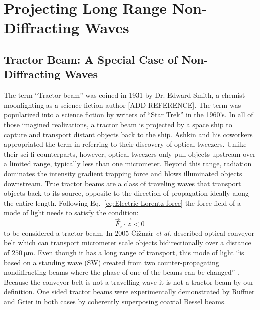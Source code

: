 \chapter{Projecting Long Range Non-Diffracting Waves}
\label{ch:intermediate}

\section{Tractor Beam: A Special Case of  Non-Diffracting Waves}

The term ``Tractor beam'' was coined in 1931 by Dr. Edward Smith, a chemist moonlighting as a science fiction author [ADD REFERENCE]. The term was popularized into a science fiction by writers of ``Star Trek'' in the 1960's. In all of those imagined realizations, a tractor beam is projected by a space ship to capture and transport distant objects back to the ship. 
Ashkin and his coworkers \cite{block1992} appropriated the term in referring to their discovery of optical tweezers. Unlike their sci-fi counterparts, however, optical tweezers only pull objects upstream over a limited range, typically less than one micrometer. Beyond this range, radiation dominates the intensity gradient trapping force and blows illuminated objects downstream. True tractor beams are a class of traveling waves that transport objects back to its source, opposite to the direction of propagation ideally along the entire length. Following Eq.~\eqref{eq:Electric Lorentz force} the force field of a mode of light needs to satisfy the condition:
\begin{equation}
\label{eq:Tractor Fz condition}
\vec{F}_{z}\cdot \vec{\hat{z}} <0
\end{equation}
to be considered a tractor beam. In $2005 $ \v Ci\v zm\'ar \emph{et al.} \cite{cizmar2005} described optical conveyor belt which can transport micrometer scale objects bidirectionally over a distance of $\SI{250}{\um}$. Even though it has a long range of transport, this mode of light ``is based on a standing wave (SW) created from two counter-propagating nondiffracting beams where the phase of one of the beams can be changed'' \cite{cizmar2005}. Because the conveyor belt is not a travelling wave it is not a tractor beam by our definition. One sided tractor beams were experimentally demonstrated by Ruffner and Grier \cite{ruffner2012prl} in both cases by coherently superposing coaxial Bessel beams.


